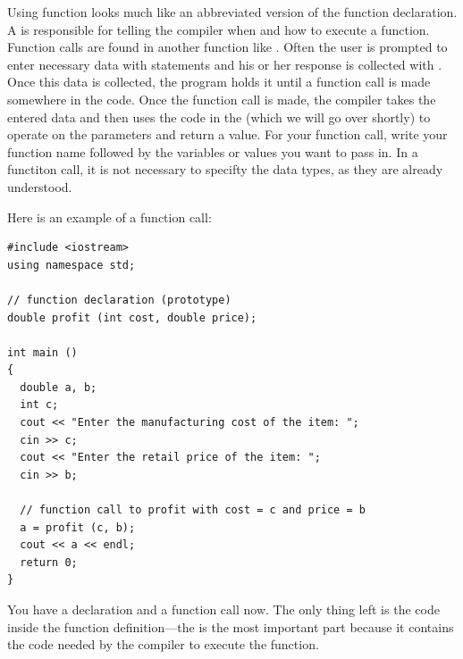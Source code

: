 Using function looks much like an abbreviated version of the function declaration. 
A  is responsible for telling the compiler when and how to execute a function.
Function calls are found in another function like . 
Often the user is prompted to enter necessary data with  statements and his or her response is collected with . 
Once this data is collected, the program holds it until a function call is made somewhere in the code.
Once the function call is made, the compiler takes the entered data and then uses the code in the  (which we will go over shortly) to operate on the parameters and return a value. 
For your function call, write your function name followed by the variables or values you want to pass in.
In a functiton call, it is not necessary to specifty the data types, as they are already understood.
 
\noindent Here is an example of a function call: \nopagebreak[4]

\noindent\begin{minipage}{\linewidth}\begin{lstlisting}
#include <iostream>
using namespace std;

// function declaration (prototype)
double profit (int cost, double price); 

int main ()
{
  double a, b;
  int c;
  cout << "Enter the manufacturing cost of the item: ";
  cin >> c;
  cout << "Enter the retail price of the item: ";
  cin >> b;
 
  // function call to profit with cost = c and price = b
  a = profit (c, b); 
  cout << a << endl;
  return 0;
}
\end{lstlisting}\end{minipage}
  
You have a declaration and a function call now. 
The only thing left is the code inside the function definition---the  is the most important part because it contains the code needed by the compiler to execute the function.

